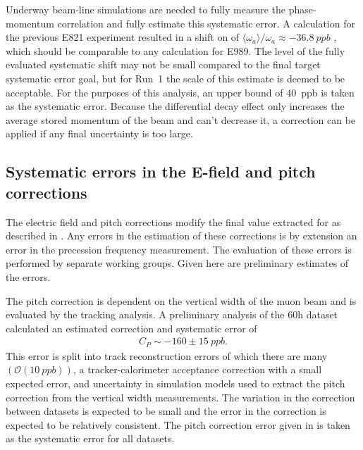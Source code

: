 Underway beam-line simulations are needed to fully measure the phase-momentum correlation and fully estimate this systematic error. A calculation for the previous E821 experiment resulted in a shift on \wa of $\langle \omega_{a} \rangle / \omega_{a} \approx \SI{-36.8}{ppb}$ \cite{DiffDecayJason}, which should be comparable to any calculation for E989. The level of the fully evaluated systematic shift may not be small compared to the final target systematic error goal, but for Run~1 the scale of this estimate is deemed to be acceptable. For the purposes of this analysis, an upper bound of \SI{40}{ppb} is taken as the systematic error. Because the differential decay effect only increases the average stored momentum of the beam and can't decrease it, a correction can be applied if any final uncertainty is too large. 






\subsection{Systematic errors in the E-field and pitch corrections}
\label{sub:EfieldPitchErrors}


The electric field and pitch corrections modify the final value extracted for \wa as described in . Any errors in the estimation of these corrections is by extension an error in the precession frequency measurement. The evaluation of these errors is performed by separate working groups. Given here are preliminary estimates of the errors. 


The pitch correction is dependent on the vertical width of the muon beam and is evaluated by the tracking analysis. A preliminary analysis of the 60h dataset calculated an estimated correction and systematic error of \cite{PitchReview,PitchElba}
    \begin{align} \label{eq:pitchError}
        C_{P} \sim -160 \pm \SI{15}{ppb}.
    \end{align}
This error is split into track reconstruction errors of which there are many $(\mathcal{O}(\SI{10}{ppb}))$, a tracker-calorimeter acceptance correction with a small expected error, and uncertainty in simulation models used to extract the pitch correction from the vertical width measurements. The variation in the correction between datasets is expected to be small and the error in the correction is expected to be relatively consistent. The pitch correction error given in  is taken as the systematic error for all datasets. 

